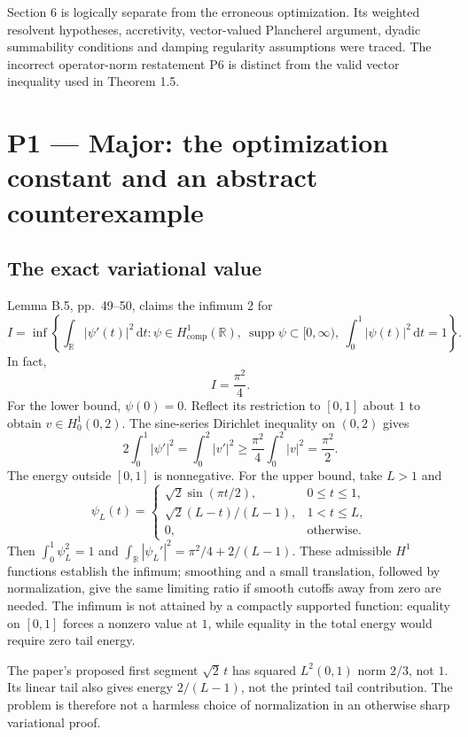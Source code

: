 \documentclass[10pt]{article}
\begin{document}
Section 6 is logically separate from the erroneous optimization. Its weighted resolvent hypotheses, accretivity, vector-valued Plancherel argument, dyadic summability conditions and damping regularity assumptions were traced. The incorrect operator-norm restatement P6 is distinct from the valid vector inequality used in Theorem 1.5.\par
\section*{P1 — Major: the optimization constant and an abstract counterexample}
\subsection*{The exact variational value}
Lemma B.5, pp. 49–50, claims the infimum \(2\) for \[I=\inf\left\{\int_\mathbb R|\psi'(t)|^2\,\mathrm dt:
 \psi\in H^1_{\mathrm{comp}}(\mathbb R),\
 \operatorname{supp}\psi\subset[0,\infty),\
 \int_0^1|\psi(t)|^2\,\mathrm dt=1\right\}.\] In fact, \[I=\frac{\pi^2}{4}.\] For the lower bound, \(\psi(0)=0\). Reflect its restriction to \([0,1]\) about \(1\) to obtain \(v\in H^1_0(0,2)\). The sine-series Dirichlet inequality on \((0,2)\) gives \[2\int_0^1|\psi'|^2
 =\int_0^2|v'|^2
 \geq\frac{\pi^2}{4}\int_0^2|v|^2
 =\frac{\pi^2}{2}.\] The energy outside \([0,1]\) is nonnegative. For the upper bound, take \(L>1\) and \[\psi_L(t)=
 \begin{cases}
  \sqrt2\sin(\pi t/2),&0\leq t\leq1,\\
  \sqrt2(L-t)/(L-1),&1<t\leq L,\\
  0,&\text{otherwise}.
 \end{cases}\] Then \(\int_0^1\psi_L^2=1\) and \(\int_\mathbb R|\psi_L'|^2=\pi^2/4+2/(L-1)\). These admissible \(H^1\) functions establish the infimum; smoothing and a small translation, followed by normalization, give the same limiting ratio if smooth cutoffs away from zero are needed. The infimum is not attained by a compactly supported function: equality on \([0,1]\) forces a nonzero value at \(1\), while equality in the total energy would require zero tail energy.\par
The paper’s proposed first segment \(\sqrt2\,t\) has squared \(L^2(0,1)\) norm \(2/3\), not \(1\). Its linear tail also gives energy \(2/(L-1)\), not the printed tail contribution. The problem is therefore not a harmless choice of normalization in an otherwise sharp variational proof.\par
\end{document}
